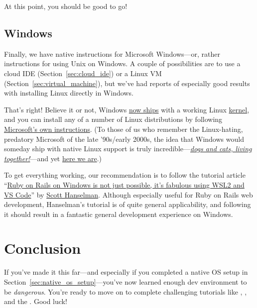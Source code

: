 At this point, you should be good to go!


\subsection{Windows} %
\label{sec:windows}

Finally, we have native instructions for Microsoft Windows---or, rather instructions for using Unix on Windows. A couple of possibilities are to use a cloud IDE (Section~\ref{sec:cloud_ide}) or a Linux VM (Section~\ref{sec:virtual_machine}), but we've had reports of especially good results with installing Linux directly in Windows.

That's right! Believe it or not, Windows \href{https://devblogs.microsoft.com/commandline/announcing-wsl-2/}{now ships} with a working Linux \href{https://en.wikipedia.org/wiki/Kernel_(operating_system)}{kernel}, and you can install any of a number of Linux distributions by following \href{https://docs.microsoft.com/en-us/windows/wsl/install-win10}{Microsoft's own instructions}. (To those of us who remember the Linux-hating, predatory Microsoft of the late '90s/early 2000s, the idea that Windows would someday ship with native Linux support is truly incredible---\href{https://youtu.be/JmzuRXLzqKk}{\emph{dogs and cats, living together!}}---and yet \href{https://docs.microsoft.com/en-us/windows/wsl/install-win10}{here we are}.)

To get everything working, our recommendation is to follow the tutorial article ``\href{https://www.hanselman.com/blog/RubyOnRailsOnWindowsIsNotJustPossibleItsFabulousUsingWSL2AndVSCode.aspx}{Ruby on Rails on Windows is not just possible, it's fabulous using WSL2 and VS Code}'' by \href{https://www.hanselman.com/}{Scott Hanselman}. Although especially useful for Ruby on Rails web development, Hanselman's tutorial is of quite general applicability, and following it should result in a fantastic general development experience on Windows.




\section{Conclusion} %
\label{sec:conclusion}

If you've made it this far---and especially if you completed a native OS setup in Section~\ref{sec:native_os_setup}---you've now learned enough dev environment to be \emph{dangerous}. You're ready to move on to complete challenging tutorials like \lecss, \ler, and the \rort. Good luck!


\bigskip

